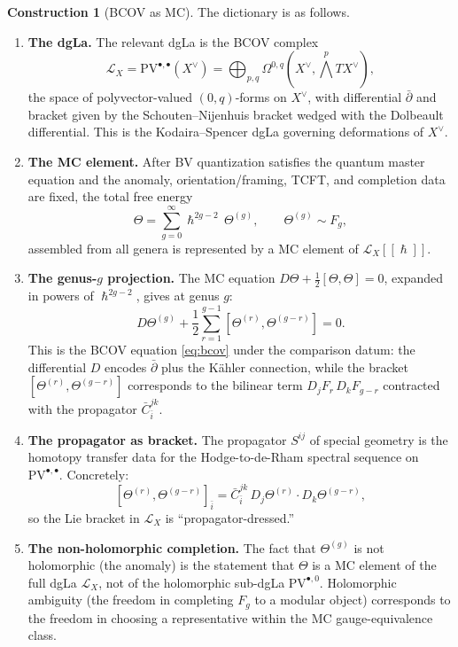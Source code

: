 \documentclass[11pt]{amsart}
\theoremstyle{plain}
\theoremstyle{definition}
\newtheorem{construction}[theorem]{Construction}
\theoremstyle{remark}
\renewcommand{\hbar}{\hslash}
\begin{document}
\begin{construction}[BCOV as MC]
\label{constr:bcov-mc}
The dictionary is as follows.

\begin{enumerate}[label=(\roman*)]
 \item \textbf{The dgLa.} The relevant dgLa is the BCOV complex
 \[
 \mathcal{L}_X = \mathrm{PV}^{\bullet,\bullet}(X^\vee) =
 \bigoplus_{p,q} \Omega^{0,q}(X^\vee, \bigwedge^p TX^\vee),
 \]
 the space of polyvector-valued $(0,q)$-forms on $X^\vee$, with
 differential $\bar{\partial}$ and bracket given by the Schouten--Nijenhuis
 bracket wedged with the Dolbeault differential. This is the
 Kodaira--Spencer dgLa governing deformations of $X^\vee$.

 \item \textbf{The MC element.} After BV quantization satisfies the
 quantum master equation and the anomaly, orientation/framing, TCFT, and
 completion data are fixed, the total free energy
 \[
 \Theta = \sum_{g=0}^{\infty} \hbar^{2g-2}\, \Theta^{(g)},
 \qquad \Theta^{(g)} \sim F_g,
 \]
 assembled from all genera is represented by a MC element of
 $\mathcal{L}_X[[\hbar]]$.

 \item \textbf{The genus-$g$ projection.} The MC equation
 $D\Theta + \frac{1}{2}[\Theta,\Theta] = 0$, expanded in powers of
 $\hbar^{2g-2}$, gives at genus $g$:
 \begin{equation}\label{eq:mc-genus-g}
 D\Theta^{(g)} + \frac{1}{2} \sum_{r=1}^{g-1}
 [\Theta^{(r)}, \Theta^{(g-r)}] = 0.
 \end{equation}
 This is the BCOV equation \eqref{eq:bcov} under the comparison datum:
 the differential
 $D$ encodes $\bar{\partial}$ plus the K\"ahler connection, while
 the bracket $[\Theta^{(r)}, \Theta^{(g-r)}]$ corresponds to the
 bilinear term $D_j F_r\, D_k F_{g-r}$ contracted with the propagator
 $\bar{C}^{jk}_{\bar{i}}$.

 \item \textbf{The propagator as bracket.} The propagator $S^{ij}$
 of special geometry is the homotopy transfer data for the
 Hodge-to-de-Rham spectral sequence on $\mathrm{PV}^{\bullet,\bullet}$.
 Concretely:
 \[
 [\Theta^{(r)}, \Theta^{(g-r)}]_{\bar{i}}
 = \bar{C}^{jk}_{\bar{i}}\, D_j \Theta^{(r)} \cdot D_k \Theta^{(g-r)},
 \]
 so the Lie bracket in $\mathcal{L}_X$ is ``propagator-dressed.''

 \item \textbf{The non-holomorphic completion.} The fact that $\Theta^{(g)}$
 is not holomorphic (the anomaly) is the statement that $\Theta$ is a MC
 element of the full dgLa $\mathcal{L}_X$, not of the holomorphic
 sub-dgLa $\mathrm{PV}^{\bullet,0}$. Holomorphic ambiguity (the freedom
 in completing $F_g$ to a modular object) corresponds to the freedom in
 choosing a representative within the MC gauge-equivalence class.
\end{enumerate}
\end{construction}
\end{document}
